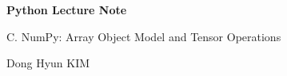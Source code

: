 \documentclass[a4paper,11pt]{article}
\begin{document}

\begin{titlepage}
    \centering
    \vspace*{\fill}

    {\Huge\bfseries Python Lecture Note\par}

    \vspace{1cm}

    {\Large C. NumPy: Array Object Model and Tensor Operations\par}

    \vspace{0.5cm}

    {\large Dong Hyun KIM\par}

    \vspace*{\fill}
\end{titlepage}



\end{document}
